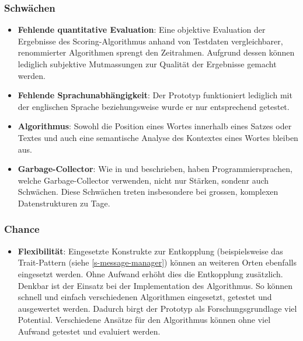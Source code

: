 \subsubsection{Schwächen}

\begin{itemize}
    \item \textbf{Fehlende quantitative Evaluation}: Eine objektive Evaluation der Ergebnisse des Scoring-Algorithmus anhand von Testdaten vergleichbarer, renommierter Algorithmen sprengt den Zeitrahmen. Aufgrund dessen können lediglich subjektive Mutmassungen zur Qualität der Ergebnisse gemacht werden.
    \item \textbf{Fehlende Sprachunabhängigkeit}: Der Prototyp funktioniert lediglich mit der englischen Sprache beziehungsweise wurde er nur entsprechend getestet.
    \item \textbf{Algorithmus}: Sowohl die Position eines Wortes innerhalb eines Satzes oder Textes und auch eine semantische Analyse des Kontextes eines Wortes bleiben aus.
    \item \textbf{Garbage-Collector}: Wie in \cite[S.~1-3]{cohen2015data} und \cite[S.~1-2]{nguyen2016yak} beschrieben, haben Programmiersprachen, welche Garbage-Collector verwenden, nicht nur Stärken, sondenr auch Schwächen. Diese Schwächen treten insbesondere bei grossen, komplexen Datenstrukturen zu Tage.
    
\end{itemize}

\subsubsection{Chance}

\begin{itemize}
    \item \textbf{Flexibilität}: Eingesetzte Konstrukte zur Entkopplung (beispielsweise das Trait-Pattern (siehe \autoref{s-message-manager}) können an weiteren Orten ebenfalls eingesetzt werden. Ohne Aufwand er\-höht dies die Entkopplung zusätzlich. Denkbar ist der Einsatz bei der Implementation des Algorithmus. So können schnell und einfach verschiedenen Algorithmen eingesetzt, getestet und ausgewertet werden. Dadurch birgt der Prototyp als Forschungsgrundlage viel Potential. Verschiedene Ansätze für den Algorithmus können ohne viel Aufwand getestet und evaluiert werden.
\end{itemize}


